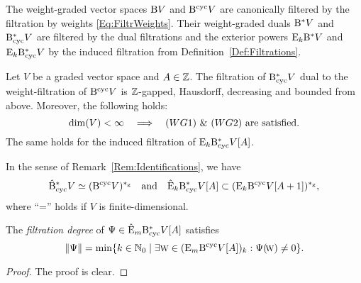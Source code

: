 \documentclass[\MainFolder/Text.tex]{subfiles}
\begin{document}
The weight-graded vector spaces $\mathrm{B} V$ and $\mathrm{B}^{\mathrm{cyc}} V$ are canonically filtered by the filtration by weights \eqref{Eq:FiltrWeights}. Their weight-graded duals $\mathrm{B}^* V$ and $\mathrm{B}_{\mathrm{cyc}}^* V$ are filtered by the dual filtrations and the exterior powers $\mathrm{E}_k \mathrm{B}^* V$ and $\mathrm{E}_k \mathrm{B}_{\mathrm{cyc}}^* V$ by the induced filtration from Definition~\ref{Def:Filtrations}. 

\begin{Proposition} \label{Prop:Compl}
Let $V$ be a graded vector space and $A\in \mathbb{Z}$. The filtration of $\mathrm{B}_{\mathrm{cyc}}^* V$ dual to the weight-filtration of $\mathrm{B}^{\mathrm{cyc}} V$ is $\mathbb{Z}$-gapped, Hausdorff,  decreasing and bounded from above. Moreover, the following holds:
$$ \dim(V)<\infty\quad\Implies\quad (WG1)\ \&\ (WG2)\text{ are satisfied.} $$
The same holds for the induced filtration of $\mathrm{E}_k \mathrm{B}_{\mathrm{cyc}}^* V[A]$.

In the sense of Remark~\ref{Rem:Identifications}, we have
$$ \hat{\mathrm{B}}_{\mathrm{cyc}}^* V \simeq (\mathrm{B}^{\mathrm{cyc}} V)^{*_{\mathrm{g}}}\quad\text{and}\quad \hat{\mathrm{E}}_k \mathrm{B}_{\mathrm{cyc}}^* V[A] \subset (\mathrm{E}_k \mathrm{B}^{\mathrm{cyc}} V[A+1])^{*_{\mathrm{g}}}, $$
where ``='' holds if $V$ is finite-dimensional.

The \emph{filtration degree} of $\Psi\in \hat{\mathrm{E}}_m \mathrm{B}_{\mathrm{cyc}}^* V[A]$ satisfies
$$ \| \Psi \| = \min\{k\in \mathbb{N}_0 \mid \exists \text{\footnotesize W}\in (\mathrm{E}_m \mathrm{B}^{\mathrm{cyc}} V[A])_k: \Psi(\!\text{\footnotesize W})\neq 0 \}.$$
\end{Proposition}

\begin{proof}
The proof is clear.
\end{proof}
\end{document}
